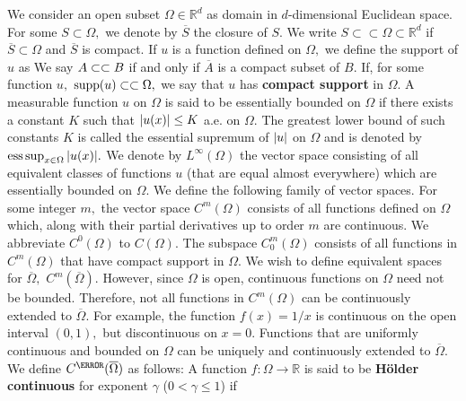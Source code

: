We consider an open subset $\Omega\in\mathbb{R}^d$ as domain in $d$-dimensional Euclidean space. For some $S\subset\Omega,$ we denote by $\overline{S}$ the closure of $S.$ We write $S\subset\subset\Omega\subset\mathbb{R}^d$ if $\overline{S}\subset\Omega$ and $\overline{S}$ is compact. If $u$ is a function defined on $\Omega,$ we define the support of $u$ as
We say $A\subset\subset B$ if and only if $\overline{A}$ is a compact subset of $B.$ If, for some function $u,$ $\mathrm{supp}(u)\subset\subset\Omega,$ we say that $u$ has \textbf{compact support} in $\Omega.$ A measurable function $u$ on $\Omega$ is said to be essentially bounded on $\Omega$ if there exists a constant $K$ such that $\abs{u(x)}\leq K$ a.e. on $\Omega.$ The greatest lower bound of such constants $K$ is called the essential supremum of $\abs{u}$ on $\Omega$ and is denoted by $\mathrm{ess}\sup_{x\in\Omega}\abs{u(x)}.$ We denote by $L^\infty(\Omega)$ the vector space consisting of all equivalent classes of functions $u$ (that are equal almost everywhere) which are essentially bounded on $\Omega.$
We define the following family of vector spaces. For some integer $m,$ the vector space $C^m(\Omega)$ consists of all functions defined on $\Omega$ which, along with their partial derivatives up to order $m$ are continuous.
We abbreviate $C^0(\Omega)$ to $C(\Omega).$ The subspace $C_0^m(\Omega)$ consists of all functions in $C^m(\Omega)$ that have compact support in $\Omega.$ We wish to define equivalent spaces for $\overline{\Omega},$ $C^m(\overline{\Omega}).$ However, since $\Omega$ is open, continuous functions on $\Omega$ need not be bounded. Therefore, not all functions in $C^m(\Omega)$ can be continuously extended to $\overline{\Omega}.$ For example, the function $f(x)=1/x$ is continuous on the open interval $(0,1),$ but discontinuous on $x=0.$ Functions that are uniformly continuous and bounded on $\Omega$ can be uniquely and continuously extended to $\overline{\Omega}.$ We define $C^\m(\overline{\Omega})$ as follows:
A function $f:\Omega\rightarrow\mathbb{R}$ is said to be \textbf{H\"older continuous} for exponent $\gamma$ ($0<\gamma\leq1$) if

